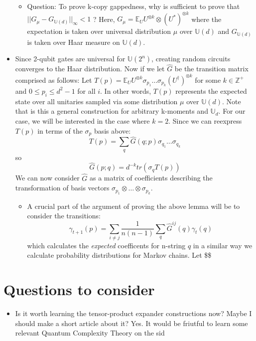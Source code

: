 \documentclass[a4paper]{article}
\begin{document}
\begin{itemize}
\begin{itemize}
\item Question: To prove k-copy gappedness, why is sufficient to prove that \(||G_{\mu} - G_{\mathbb{U}(d)}||_{\infty} < 1\) ? Here, \(G_{\mu} = \mathbb{E}_U U^{\otimes k} \otimes (U^*)^{\otimes k}\) where the expectation is taken over universal distribution \(\mu\) over \(\mathbb{U}(d)\) and \(G_{\mathbb{U}(d)}\) is taken over Haar measure on \(\mathbb{U}(d)\).
\end{itemize}

\item Since 2-qubit gates are universal for \(\mathbb{U}(2^n)\), creating random circuits converges to the Haar distribution. Now if we let \(\hat{G}\) be the transition matrix comprised as follows: Let \(T(p) = \mathbb{E}_U U^{\otimes k} \sigma_{p_1} \dots \sigma_{p_k} (U^\dagger)^{\otimes k}\) for some \(k \in \mathbb{Z}^+\) and \(0 \leq p_i \leq d^2-1\) for all \(i\). In other words, \(T(p)\) represents the expected state over all unitaries sampled via some distribution \(\mu\) over \(\mathbb{U}(d)\). Note that is this a general construction for arbitrary k-moments and \(\mathbb{U}_d\). For our case, we will be interested in the case where \(k=2\). Since we can reexpress \(T(p)\) in terms of the \(\sigma_p\) basis above:
$$ T(p) = \sum_{q} \hat{G}(q;p) \sigma_{q_1}\dots\sigma_{q_k} $$
so
$$ \hat{G}(p;q) = d^{-k} tr(\sigma_q T(p)) $$
We can now consider \(\hat{G}\) as a matrix of coefficients describing the transformation of basis vectors \(\sigma_{p_1}\otimes \dots \otimes \sigma_{p_k}\).
\begin{itemize}
\item A crucial part of the argument of proving the above lemma will be to consider the transitions:
$$ \gamma_{t+1}(p) = \sum_{i\neq j} \frac{1}{n(n-1)}\sum_{q} \hat{G}^{ij}(q)\gamma_t(q) $$
which calculates the \emph{expected} coefficents for n-string \(q\) in a similar way we calculate probability distributions for Markov chains. Let \$\$
\end{itemize}
\end{itemize}

\section{Questions to consider}
\label{sec:org17d32a6}

\begin{itemize}
\item Is it worth learning the tensor-product expander constructions now? Maybe I should make a short article about it?
Yes. It would be friutful to learn some relevant Quantum Complexity Theory on the sid
\end{itemize}
\end{document}
